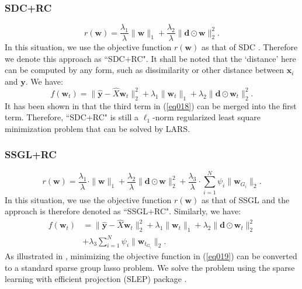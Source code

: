 \documentclass[journal]{IEEEtran}
\begin{document}
  \subsubsection{SDC+RC}

  \begin{equation}
 r(\textbf{w})=\frac{\lambda_1}{\lambda}\|\textbf{w}\|_1+\frac{\lambda_2}{\lambda}\| \textbf{d}\odot \textbf{w}\|_2^2.
  \end{equation}
  In this situation, we use the objective function $r(\textbf{w})$ as that of 	SDC \cite{CJ15}. Therefore we denote this approach as ``SDC+RC".
   It shall be noted that the   `distance' here can be computed by any form, such as dissimilarity or other distance between  $\textbf{x}_i$  and $\textbf{y}$.  We have:
   \begin{equation} f(\textbf{w}_t)=\|\hat{\textbf{y}}-\hat{X}\textbf{w}_t\|^2_2+ \lambda_1 \|\textbf{w}_t\|_1+ \lambda_2\| \textbf{d}\odot \textbf{w}_t\|_2^2. \label{eq018}
  \end{equation}
    It has been shown in  \cite{CJ15} that the third term in (\ref{eq018}) can be merged into the first term. Therefore,  ``SDC+RC"  is still a $\ell_1$-norm regularized least square minimization problem that can be solved by LARS.

  \subsubsection{SSGL+RC}
 \begin{equation} r(\textbf{w})=\frac{\lambda_1}{\lambda} \cdot
  \|\textbf{w}\|_1+\frac{\lambda_2}{\lambda}\|\textbf{d} \odot \textbf{w} \|_2^2+ \frac{\lambda_3}{\lambda} \cdot  \sum_{i=1}^N\psi_i\|\textbf{w}_{G_i}\|_2.
  \end{equation}
   In this situation, we use the objective function $r(\textbf{w})$ as that of SSGL \cite{Cheng:17BOE} and the approach is therefore denoted as ``SSGL+RC".
  Similarly, we have:
   \begin{align} f(\textbf{w}_t)&=\|\hat{\textbf{y}}-\hat{X}\textbf{w}_t\|^2_2+ \lambda_1 \|\textbf{w}_t\|_1+ \lambda_2\| \textbf{d}\odot \textbf{w}_t\|_2^2 \nonumber
   \\ &+\lambda_3   \sum_{i=1}^N\psi_i\|\textbf{w}_{t_{G_i}}\|_2.  \label{eq019}
  \end{align}
  As illustrated in \cite{Cheng:17BOE}, minimizing the objective function in (\ref{eq019}) can be converted to a standard sparse group lasso problem. We solve the
  problem using the sparse learning with efficient projection (SLEP) package \cite{Liu:2009:SLEP:manual}.
\end{document}
